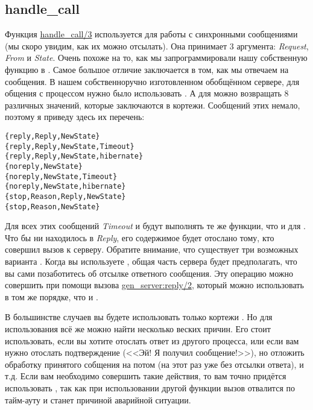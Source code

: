 \subsection{handle\_call}
\label{handle-call}
Функция \href{http://erldocs.com/R15B/stdlib/gen\_server.html#handle\_call/3}{handle\_call/3} используется для работы с синхронными сообщениями (мы скоро увидим, как их можно отсылать).
Она принимает 3 аргумента: \emph{Request}, \emph{From} и \emph{State}.
Очень похоже на то, как мы запрограммировали нашу собственную функцию  в .
Самое большое отличие заключается в том, как мы отвечаем на сообщения.
В нашем собственноручно изготовленном обобщённом сервере, для общения с процессом нужно было использовать .
А для  можно возвращать 8 различных значений, которые заключаются в кортежи.
Сообщений этих немало, поэтому я приведу здесь их перечень:
\begin{lstlisting}[style=erlang]
{reply,Reply,NewState}
{reply,Reply,NewState,Timeout}
{reply,Reply,NewState,hibernate}
{noreply,NewState}
{noreply,NewState,Timeout}
{noreply,NewState,hibernate}
{stop,Reason,Reply,NewState}
{stop,Reason,NewState}
\end{lstlisting}
Для всех этих сообщений \emph{Timeout} и  будут выполнять те же функции, что и для .
Что бы ни находилось в \emph{Reply}, его содержимое будет отослано тому, кто совершил вызов к серверу.
Обратите внимание, что существует три возможных варианта .
Когда вы используете , общая часть сервера будет предполагать, что вы сами позаботитесь об отсылке ответного сообщения.
Эту операцию можно совершить при помощи вызова \href{http://erldocs.com/R15B/stdlib/gen\_server.html#reply/2}{gen\_server:reply/2}, который можно использовать в том же порядке, что и .

В большинстве случаев вы будете использовать только кортежи .
Но для использования  всё же можно найти несколько веских причин.
Его стоит использовать, если вы хотите отослать ответ из другого процесса, или если вам нужно отослать подтверждение (<<Эй! Я получил сообщение!>>), но отложить обработку принятого собщения на потом (на этот раз уже без отсылки ответа), и т.д.
Если вам необходимо совершить такие действия, то вам точно придётся использовать , так как при использовании другой функции вызов отвалится по тайм\--ауту и станет причиной аварийной ситуации. 
